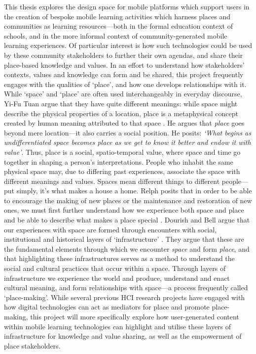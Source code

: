 This thesis explores the design space for mobile platforms which support users in the creation of bespoke mobile learning activities which harness places and communities as learning resources---both in the formal education context of schools, and in the more informal context of community-generated mobile learning experiences. Of particular interest is how such technologies could be used by these community stakeholders to further their own agendas, and share their place-based knowledge and values. In an effort to understand how stakeholders' contexts, values and knowledge can form and be shared, this project frequently engages with the qualities of `place', and how one develops relationships with it. While ‘space’ and ‘place’ are often used interchangeably in everyday discourse, Yi-Fu Tuan argue that they have quite different meanings: while space might describe the physical properties of a location, place is a metaphysical concept created by human meaning attributed to that space \citep{Tuan1978}. He argues that \textit{place} goes beyond mere location---it also carries a social position. He posits: \textit{`What begins as undifferentiated space becomes place as we get to know it better and endow it with value'}. Thus, place is a social, spatio-temporal value, where space and time go together in shaping a person's interpretations. People who inhabit the same physical space may, due to differing past experiences, associate the space with different meanings and values. Spaces mean different things to different people---put simply, it's what makes a house a home. Relph posits that in order to be able to encourage the making of new places or the maintenance and restoration of new ones, we must first further understand how we experience both space and place and be able to describe what makes a place special \citep{Relph1976}. Dourish and Bell argue that our experiences with space are formed through encounters with social, institutional and historical layers of `infrastructure' \citep{Dourish2007}. They argue that these are the fundamental elements through which we encounter \textit{space} and form \textit{place}, and that highlighting these infrastructures serves as a method to understand the social and cultural practices that occur within a space. Through layers of infrastructure we experience the world and produce, understand and enact cultural meaning, and form relationships with space---a process frequently called `place-making'. While several previous HCI research projects have engaged with how digital technologies can act as mediators for place and promote place-making, this project will more specifically explore how user-generated content within mobile learning technologies can highlight and utilise these layers of infrastructure for knowledge and value sharing, as well as the empowerment of place stakeholders.  

